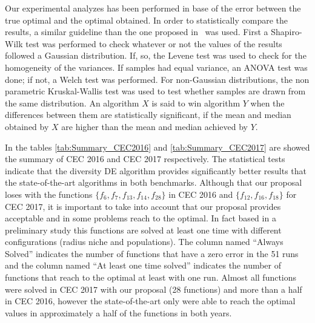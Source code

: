 Our experimental analyzes has been performed in base of the error between the true optimal and the optimal obtained.
%
In order to statistically compare the results, a similar guideline than the one proposed in~\cite{Joel:StatisticalTest} was used. 
%
First a Shapiro-Wilk test was performed to check whatever or not the values of the results followed a Gaussian distribution. 
%
If, so, the Levene test was used to check for the homogeneity of the variances. 
%
If samples had equal variance, an ANOVA test was done; if not, a Welch test was performed. 
%
For non-Gaussian distributions, the non parametric Kruskal-Wallis test was used to test whether samples are drawn from the same distribution. 
%
An algorithm $X$ is said to win algorithm $Y$ when the differences between them are statistically significant, if the mean and median obtained by $X$ are higher than the mean and median achieved by $Y$.

In the tables \ref{tab:Summary_CEC2016} and \ref{tab:Summary_CEC2017} are showed the summary of CEC 2016 and CEC 2017 respectively.
%
The statistical tests indicate that the diversity DE algorithm provides significantly better results that the state-of-the-art algorithms in both benchmarks.
%
Although that our proposal loses with the functions $\{f_6, f_7, f_{13}, f_{14}, f_{28}\}$ in CEC 2016 and $\{ f_{12}, f_{16}, f_{18} \}$ for CEC 2017, it is important to take into account that our proposal provides acceptable and in some problems reach to the optimal.
%
In fact based in a preliminary study this functions are solved at least one time with different configurations (radius niche and populations).
%
The column named ``Always Solved'' indicates the number of functions that have a zero error in the 51 runs and the column named ``At least one time solved'' indicates the number of functions that reach to the optimal at least with one run.
%
Almost all functions were solved in CEC 2017 with our proposal (28 functions) and more than a half in CEC 2016, however the state-of-the-art only were able to reach the optimal values in approximately a half of the functions in both years.


